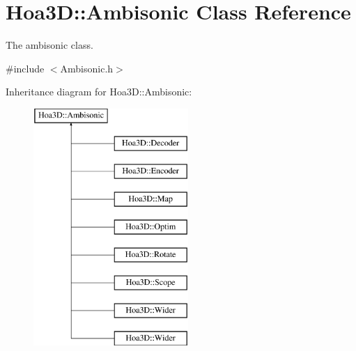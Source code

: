 \hypertarget{class_hoa3_d_1_1_ambisonic}{\section{Hoa3\-D\-:\-:Ambisonic Class Reference}
\label{class_hoa3_d_1_1_ambisonic}
}


The ambisonic class.  




{\ttfamily \#include $<$Ambisonic.\-h$>$}

Inheritance diagram for Hoa3\-D\-:\-:Ambisonic\-:\begin{figure}[H]
\begin{center}
\leavevmode
\includegraphics[height=9.000000cm]{class_hoa3_d_1_1_ambisonic}
\end{center}
\end{figure}

